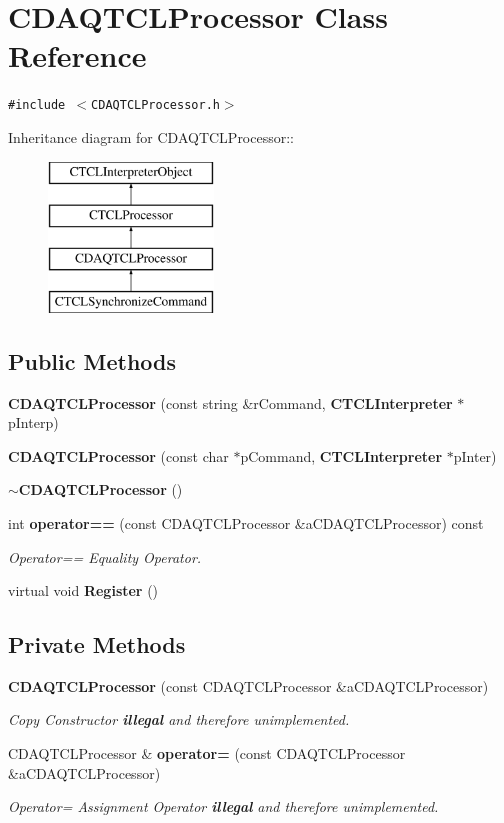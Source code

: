 \section{CDAQTCLProcessor  Class Reference}
\label{classCDAQTCLProcessor}
{\tt \#include $<$CDAQTCLProcessor.h$>$}

Inheritance diagram for CDAQTCLProcessor::\begin{figure}[H]
\begin{center}
\leavevmode
\includegraphics[height=4cm]{classCDAQTCLProcessor}
\end{center}
\end{figure}
\subsection*{Public Methods}
\begin{CompactItemize}
\item 
{\bf CDAQTCLProcessor} (const string \&r\-Command, {\bf CTCLInterpreter} $\ast$p\-Interp)
\item 
{\bf CDAQTCLProcessor} (const char $\ast$p\-Command, {\bf CTCLInterpreter} $\ast$p\-Inter)
\item 
{\bf $\sim$CDAQTCLProcessor} ()
\item 
int {\bf operator==} (const CDAQTCLProcessor \&a\-CDAQTCLProcessor) const
\begin{CompactList}\small\item\em Operator== Equality Operator.\item\end{CompactList}\item 
virtual void {\bf Register} ()
\end{CompactItemize}
\subsection*{Private Methods}
\begin{CompactItemize}
\item 
{\bf CDAQTCLProcessor} (const CDAQTCLProcessor \&a\-CDAQTCLProcessor)
\begin{CompactList}\small\item\em Copy Constructor {\bf illegal} and therefore unimplemented.\item\end{CompactList}\item 
CDAQTCLProcessor \& {\bf operator=} (const CDAQTCLProcessor \&a\-CDAQTCLProcessor)
\begin{CompactList}\small\item\em Operator= Assignment Operator {\bf illegal} and therefore unimplemented.\item\end{CompactList}\end{CompactItemize}
